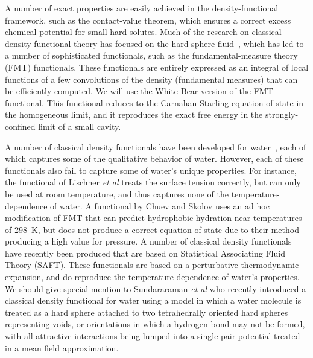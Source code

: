 \documentclass[twocolumn,amsmath,amssymb,prb]{revtex4-1}
\begin{document}
A number of exact properties are easily achieved in the
density-functional framework, such as the contact-value theorem, which
ensures a correct excess chemical potential for small hard solutes.
Much of the research on classical density-functional theory has
focused on the hard-sphere fluid~\cite{curtin1985, rosenfeld1989,
  rosenfeld1993, rosenfeld1997, tarazona1997, tarazona2000}, which has
led to a number of sophisticated functionals, such as the
fundamental-measure theory (FMT) functionals\cite{rosenfeld1989,
  rosenfeld1993, rosenfeld1997, tarazona1997, tarazona2000,
  roth2002whitebear, yu2002structures}.  These functionals are
entirely expressed as an integral of local functions of a few
convolutions of the density (fundamental measures) that can be
efficiently computed.  We will use the White Bear version of the FMT
functional\cite{roth2002whitebear, yu2002structures}.  This functional
reduces to the Carnahan-Starling equation of state in the homogeneous
limit, and it reproduces the exact free energy in the
strongly-confined limit of a small cavity.

A number of classical density functionals have been developed for
water~\cite{ding1987, Yang1992, yang1994density, gloor2002saft,
  gloor2004accurate, gloor2007prediction, Jaqaman2004,
  clark2006developing, chuev2006, lischner2010classical,
  fu2005vapor-liquid-dft,kiselev2006new, blas2001examination,
  sundararaman2012computationally}, each of
which captures some of the qualitative behavior of water.  However,
each of these functionals also fail to capture some of water's unique
properties.  For instance, the functional of Lischner \emph{et
  al}\cite{lischner2010classical} treats the surface tension
correctly, but can only be used at room temperature, and thus captures
none of the temperature-dependence of water.  A functional by Chuev
and Skolov\cite{chuev2006} uses an ad hoc modification of FMT that can
predict hydrophobic hydration near temperatures of 298~K, but does not
produce a correct equation of state due to their method producing a
high value for pressure.
A number of classical density functionals
have recently been produced that are based on Statistical Associating
Fluid Theory (SAFT)\cite{ segura1997associating, segura1998comparison,
  yu2002fmt-dft-inhomogeneous-associating,
  fu2005vapor-liquid-dft,gloor2002saft,muller2001molecular,
  clark2006developing, gloor2007prediction, gloor2004accurate,
  gross2009density, kahl2008modified, blas2001examination}.  These
functionals are based on a perturbative thermodynamic expansion, and
do reproduce the temperature-dependence of water's properties.
% 
We should give special mention to Sundararaman \emph{et al} who
recently introduced a classical density functional for water using a
model in which a water molecule is treated as a hard sphere attached to
two tetrahedrally oriented hard spheres representing voids, or
orientations in which a hydrogen bond may not be formed, with all
attractive interactions being lumped into a single pair potential
treated in a mean field
approximation\cite{sundararaman2012computationally}.
\end{document}
